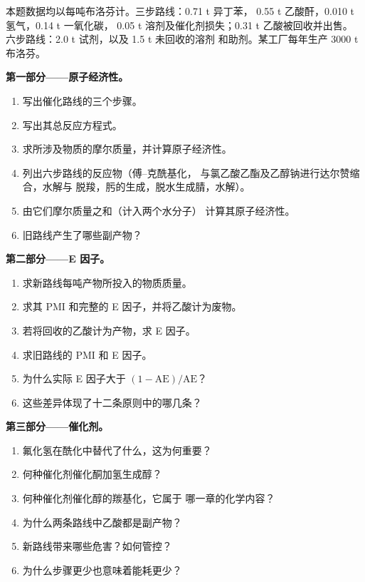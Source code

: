 \begin{problem}
\label{pb:b3:green-industrial:1}
本题数据均以每吨布洛芬计。三步路线：0.71 t 异丁苯，
0.55 t 乙酸酐，0.010 t 氢气，0.14 t 一氧化碳，
0.05 t 溶剂及催化剂损失；0.31 t 乙酸被回收并出售。
六步路线：2.0 t 试剂，以及 1.5 t 未回收的溶剂
和助剂。某工厂每年生产 3000 t 布洛芬。

\medskip\noindent\textbf{第一部分——原子经济性。}
\begin{enumerate}
  \item 写出催化路线的三个步骤。
  \item 写出其总反应方程式。
  \item 求所涉及物质的摩尔质量，并计算原子经济性。
  \item 列出六步路线的反应物（傅–克酰基化，
        与氯乙酸乙酯及乙醇钠进行达尔赞缩合，水解与
        脱羧，肟的生成，脱水生成腈，水解）。
  \item 由它们摩尔质量之和（计入两个水分子）
        计算其原子经济性。
  \item 旧路线产生了哪些副产物？
\end{enumerate}

\medskip\noindent\textbf{第二部分——E 因子。}
\begin{enumerate}[resume]
  \item 求新路线每吨产物所投入的物质质量。
  \item 求其 PMI 和完整的 E 因子，并将乙酸计为废物。
  \item 若将回收的乙酸计为产物，求 E 因子。
  \item 求旧路线的 PMI 和 E 因子。
  \item 为什么实际 E 因子大于 $(1 - \mathrm{AE})/\mathrm{AE}$？
  \item 这些差异体现了十二条原则中的哪几条？
\end{enumerate}

\medskip\noindent\textbf{第三部分——催化剂。}
\begin{enumerate}[resume]
  \item 氟化氢在酰化中替代了什么，这为何重要？
  \item 何种催化剂催化酮加氢生成醇？
  \item 何种催化剂催化醇的羰基化，它属于
        哪一章的化学内容？
  \item 为什么两条路线中乙酸都是副产物？
  \item 新路线带来哪些危害？如何管控？
  \item 为什么步骤更少也意味着能耗更少？
\end{enumerate}


\end{problem}
